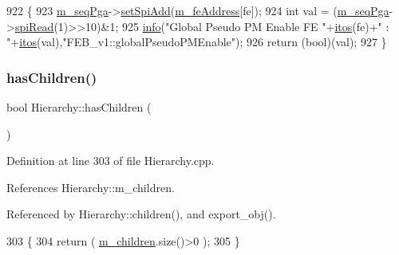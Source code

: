 \begin{DoxyCode}
922                                          \{
923   \hyperlink{classFEB__v1_a6c7804ac86796f233a8393043adf2e77}{m\_seqPga}->\hyperlink{classSeqPGA_ac998ce3a6d9b5f2e88cc8393f8c1df53}{setSpiAdd}(\hyperlink{classFEB__v1_a4e1945c2d5b434125f375e9d0fc6d99f}{m\_feAddress}[fe]);
924   \textcolor{keywordtype}{int} val = (\hyperlink{classFEB__v1_a6c7804ac86796f233a8393043adf2e77}{m\_seqPga}->\hyperlink{classSeqPGA_ab3d0e5e5d4014bc7a92588a76b8713d4}{spiRead}(1)>>10)&1;
925   \hyperlink{classObject_a644fd329ea4cb85f54fa6846484b84a8}{info}(\textcolor{stringliteral}{"Global Pseudo PM Enable FE "}+\hyperlink{Tools_8h_af330027dbdafb9a30768b3613c553e60}{itos}(fe)+\textcolor{stringliteral}{" : "}+\hyperlink{Tools_8h_af330027dbdafb9a30768b3613c553e60}{itos}(val),\textcolor{stringliteral}{"FEB\_v1::globalPseudoPMEnable"});
926   \textcolor{keywordflow}{return} (\textcolor{keywordtype}{bool})(val);
927 \}
\end{DoxyCode}
\mbox{\label{classHierarchy_a255174fe4d316d2a3f430dcb9dab29f1}} 
\subsubsection{\texorpdfstring{has\+Children()}{hasChildren()}}
{\footnotesize\ttfamily bool Hierarchy\+::has\+Children (\begin{DoxyParamCaption}{ }\end{DoxyParamCaption})\hspace{0.3cm}{\ttfamily [inherited]}}



Definition at line 303 of file Hierarchy.\+cpp.



References Hierarchy\+::m\+\_\+children.



Referenced by Hierarchy\+::children(), and export\+\_\+obj().


\begin{DoxyCode}
303                               \{
304   \textcolor{keywordflow}{return} ( \hyperlink{classHierarchy_a038816763941fd4a930504917f60483b}{m\_children}.size()>0 );
305 \}
\end{DoxyCode}
\mbox{\label{classFEB__v1_af93db546ad89ba7c2301fdc2314efd8a}} 
